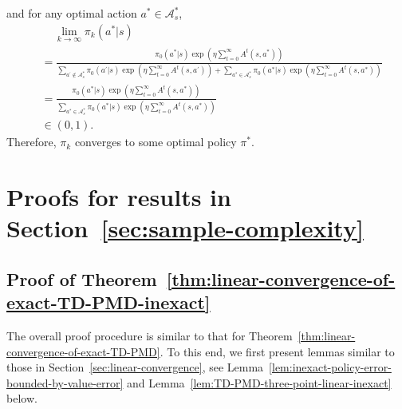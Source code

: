\documentclass[10pt]{article}
\newcommand{\calA}{\mathcal{A}}
\theoremstyle{plain}
\theoremstyle{definition}
\begin{document}
    \vspace{1em}
    and for any optimal action $a^* \in\calA^*_s$,
    \begin{align*}
        &\phantom{\quad\,}\lim_{k\to\infty} \pi_k(a^*|s) \\
        &= \frac{\pi_0(a^*|s) \exp (\eta\sum_{t=0}^{\infty} A^t(s,a^*))}{\sum_{a^\prime\not\in\calA^*_s} \pi_0(a^\prime|s) \exp (\eta\sum_{t=0}^{\infty} A^t(s,a^\prime)) + \sum_{a^*\in\calA^*_s} \pi_0(a^*|s) \exp (\eta\sum_{t=0}^{\infty} A^t(s,a^*))} \\
        &= \frac{\pi_0(a^*|s) \exp (\eta\sum_{t=0}^{\infty} A^t(s,a^*))}{\sum_{a^*\in\calA^*_s} \pi_0(a^*|s) \exp (\eta\sum_{t=0}^{\infty} A^t(s,a^*))} \\[.5em]
        &\in (0,1).
    \end{align*}
Therefore, $\pi_k$ converges to some optimal policy $\pi^*$.



\section{Proofs for results in Section~\ref{sec:sample-complexity}}

\subsection{Proof of Theorem~\ref{thm:linear-convergence-of-exact-TD-PMD-inexact}}
\label{sec:pf:thm:linear-convergence-of-exact-TD-PMD-inexact}
The overall proof procedure is similar to that for Theorem~\ref{thm:linear-convergence-of-exact-TD-PMD}. To this end, we first present lemmas similar to those in Section~\ref{sec:linear-convergence}, see Lemma~\ref{lem:inexact-policy-error-bounded-by-value-error} and Lemma~\ref{lem:TD-PMD-three-point-linear-inexact} below.
\end{document}
